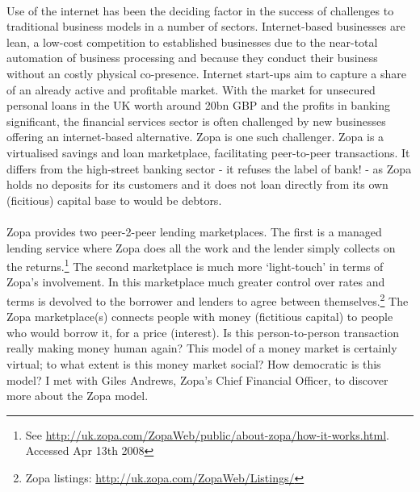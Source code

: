 \documentclass[12pt,a4paper,titlepage]{article}
\begin{document}
\paragraph{}Use of the internet has been the deciding factor in the success of challenges to traditional business models in a number of sectors. Internet-based businesses are lean, a low-cost competition to established businesses due to the near-total automation of business processing and because they conduct their business without an costly physical co-presence. Internet start-ups aim to capture a share of an already active and profitable market. With the market for unsecured personal loans in the UK worth around 20bn GBP and the profits in banking significant, the financial services sector is often challenged by new businesses offering an internet-based alternative. Zopa is one such challenger. Zopa is a virtualised savings and loan marketplace, facilitating peer-to-peer transactions. It differs from the high-street banking sector - it refuses the label of bank! - as Zopa holds no deposits for its customers and it does not loan directly from its own (ficitious) capital base to would be debtors.

\paragraph{}Zopa provides two peer-2-peer lending marketplaces. The first is a managed lending service where Zopa does all the work and the lender simply collects on the returns.\footnote{See \url{http://uk.zopa.com/ZopaWeb/public/about-zopa/how-it-works.html}. Accessed Apr 13th 2008} The second marketplace is much more `light-touch' in terms of Zopa's involvement. In this marketplace much greater control over rates and terms is devolved to the borrower and lenders to agree between themselves.\footnote{Zopa listings:  \url{http://uk.zopa.com/ZopaWeb/Listings/}} The Zopa marketplace(s) connects people with money (fictitious capital) to people who would borrow it, for a price (interest). Is this person-to-person transaction really making money human again? This model of a money market is certainly virtual; to what extent is this money market social? How democratic is this model? I met with Giles Andrews, Zopa's Chief Financial Officer, to discover more about the Zopa model.
\end{document}
